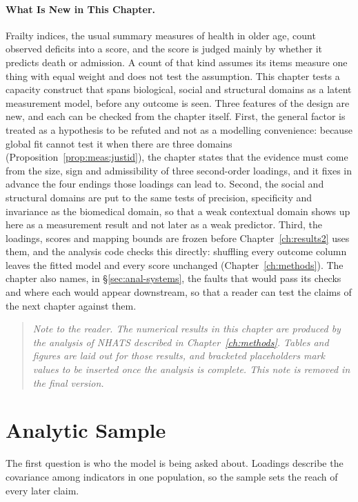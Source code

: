 \paragraph{What Is New in This Chapter.} Frailty indices, the usual summary measures of health in older age, count observed deficits into a score, and the score is judged mainly by whether it predicts death or admission. A count of that kind assumes its items measure one thing with equal weight and does not test the assumption. This chapter tests a capacity construct that spans biological, social and structural domains as a latent measurement model, before any outcome is seen. Three features of the design are new, and each can be checked from the chapter itself. First, the general factor is treated as a hypothesis to be refuted and not as a modelling convenience: because global fit cannot test it when there are three domains (Proposition~\ref{prop:meas:justid}), the chapter states that the evidence must come from the size, sign and admissibility of three second-order loadings, and it fixes in advance the four endings those loadings can lead to. Second, the social and structural domains are put to the same tests of precision, specificity and invariance as the biomedical domain, so that a weak contextual domain shows up here as a measurement result and not later as a weak predictor. Third, the loadings, scores and mapping bounds are frozen before Chapter~\ref{ch:results2} uses them, and the analysis code checks this directly: shuffling every outcome column leaves the fitted model and every score unchanged (Chapter~\ref{ch:methods}). The chapter also names, in \S\ref{sec:anal-systems}, the faults that would pass its checks and where each would appear downstream, so that a reader can test the claims of the next chapter against them.

\begin{quote}
\small\itshape
Note to the reader. The numerical results in this chapter are produced by the analysis of NHATS described in Chapter~\ref{ch:methods}. Tables and figures are laid out for those results, and bracketed placeholders mark values to be inserted once the analysis is complete. This note is removed in the final version.
\end{quote}

\section{Analytic Sample}
\label{sec:sample}
The first question is who the model is being asked about. Loadings describe the covariance among indicators in one population, so the sample sets the reach of every later claim.

